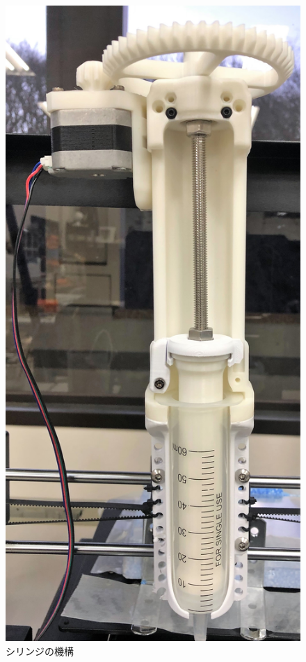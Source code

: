 \begin{figure}[H]
  \centering
  \includegraphics[width=8truecm]{./fig/101285897.jpg}
  \caption{シリンジの機構}
  \label{fig:printer2}
\end{figure}


